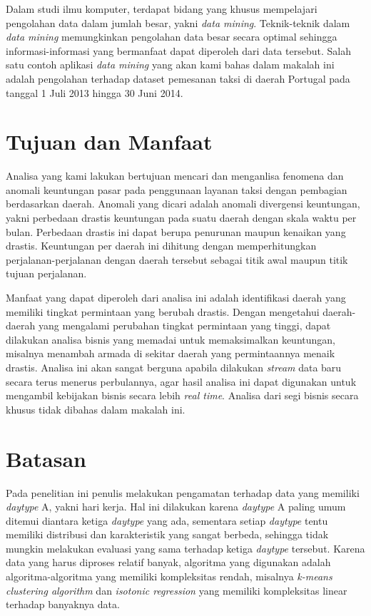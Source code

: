 \documentclass{article}
\begin{document}
Dalam studi ilmu komputer, terdapat bidang yang khusus mempelajari pengolahan data dalam jumlah besar, yakni \textit{data mining}. Teknik-teknik dalam \textit{data mining} memungkinkan pengolahan data besar secara optimal sehingga informasi-informasi yang bermanfaat dapat diperoleh dari data tersebut. Salah satu contoh aplikasi \textit{data mining} yang akan kami bahas dalam makalah ini adalah pengolahan terhadap dataset pemesanan taksi di daerah Portugal pada tanggal 1 Juli 2013 hingga 30 Juni 2014.


\section{Tujuan dan Manfaat}

Analisa yang kami lakukan bertujuan mencari dan menganlisa fenomena dan anomali keuntungan pasar pada penggunaan layanan taksi dengan pembagian berdasarkan daerah. Anomali yang dicari adalah anomali divergensi keuntungan, yakni perbedaan drastis keuntungan pada suatu daerah dengan skala waktu per bulan. Perbedaan drastis ini dapat berupa penurunan maupun kenaikan yang drastis. Keuntungan per daerah ini dihitung dengan memperhitungkan perjalanan-perjalanan dengan daerah tersebut sebagai titik awal maupun titik tujuan perjalanan.

Manfaat yang dapat diperoleh dari analisa ini adalah identifikasi daerah yang memiliki tingkat permintaan yang berubah drastis. Dengan mengetahui daerah-daerah yang mengalami perubahan tingkat permintaan yang tinggi, dapat dilakukan analisa bisnis yang memadai untuk memaksimalkan keuntungan, misalnya menambah armada di sekitar daerah yang permintaannya menaik drastis. Analisa ini akan sangat berguna apabila dilakukan \textit{stream} data baru secara terus menerus perbulannya, agar hasil analisa ini dapat digunakan untuk mengambil kebijakan bisnis secara lebih\textit{ real time}.  Analisa dari segi bisnis secara khusus tidak dibahas dalam makalah ini.

\section{Batasan}

Pada penelitian ini penulis melakukan pengamatan terhadap data yang memiliki \textit{daytype} A, yakni hari kerja. Hal ini dilakukan karena \textit{daytype} A paling umum ditemui diantara ketiga \textit{daytype} yang ada, sementara setiap \textit{daytype} tentu memiliki distribusi dan karakteristik yang sangat berbeda, sehingga tidak mungkin melakukan evaluasi yang sama terhadap ketiga \textit{daytype} tersebut. Karena data yang harus diproses relatif banyak, algoritma yang digunakan adalah algoritma-algoritma yang memiliki kompleksitas rendah, misalnya \textit{k-means clustering algorithm} dan  \textit{isotonic regression} yang memiliki kompleksitas linear terhadap banyaknya data.
\end{document}
